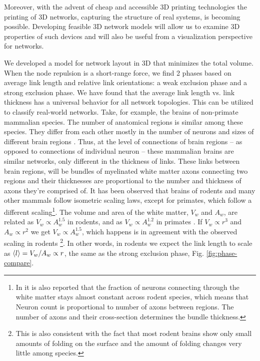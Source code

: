 \documentclass[nofootinbib,preprint,floatfix,endfloats]{revtex4} %
\begin{document}
Moreover, with the advent of cheap and accessible 3D printing technologies the printing of 3D networks, capturing the structure of real systems, is becoming possible. 
Developing feasible 3D network models will allow us to examine 3D properties of such devices and will also be useful from a visualization perspective for networks.

We developed a model for network layout in 3D that minimizes the total volume. 
When the node repulsion is a short-range force, we find 2 phases based on average link length and relative link orientations: a weak exclusion phase and a strong exclusion phase. 
We have found that the average link length vs. link thickness has a universal behavior for all network topologies. 
This can be utilized to classify real-world networks. 
Take, for example, the brains of non-primate mammalian species. 
The number of anatomical regions is similar among these species. 
They differ from each other mostly in the number of neurons and sizes of different brain regions \cite{azevedo2009equal, herculano2012remarkable, herculano2014brain}. 
Thus, at the level of connections of brain regions -- as opposed to connections of individual neuron -- these mammalian brains are similar networks, only different in the thickness of links. 
These links 
between brain regions, will be bundles of myelinated white matter axons connecting two regions and their thicknesses are proportional to the number and thickness of axons they're comprised of. 
It has been observed that brains of rodents \cite{herculano2012remarkable} and many other mammals \cite{herculano2014brain} follow isometric scaling laws, except for primates, which follow a different scaling\footnote{In \cite{herculano2012remarkable} it is also reported that the fraction of neurons connecting through the white matter stays almost constant across rodent species, which means that Neuron count is proportional to number of axons between regions. The number of axons and their cross-section determines the bundle thickness.}. 
The volume and area of the white matter, $V_w$ and $A_w$, are related as $V_w\propto A_w^{1.5}$ in rodents, and as $V_w \propto A_w^{1.2}$ in primates  \cite{herculano2012remarkable}. 
If $V_w \propto r^3$ and $A_w \propto r^2$ we get $V_w \propto A_w^{1.5}$, which happens is in agreement with the observed scaling in rodents
\footnote{This is also consistent with the fact that most rodent brains show only small amounts of folding on the surface and the amount of folding changes very little among species.}. In other words, in rodents we expect the link length to scale as $ \left<l\right> = V_w/A_w \propto r $, the same as the strong exclusion phase, Fig. \ref{fig:phase-compare}. 
\end{document}
